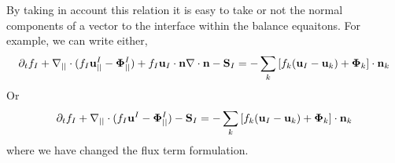 By taking in account this relation it is easy to take or not the normal components of a vector to the interface within the balance equaitons. 
For example, we can write either, 
\begin{equation}
    \partial_t f_I  
    + \mathbf{\nabla}_{||}\cdot (f_I \textbf{u}^I_{||} -\mathbf{\Phi}^I_{||})
    + f_I \textbf{u}_I \cdot \textbf{n} \mathbf{\nabla}\cdot \textbf{n}
    - \textbf{S}_I
    = 
    - \sum_k \left[
    f_k (\textbf{u}_I - \textbf{u}_k)
    + \mathbf{\Phi}_k
    \right] \cdot \textbf{n}_k 
    \label{ap:eq:dt_f_I2}
\end{equation}
Or 
\begin{equation}
    \partial_t f_I  
    + \mathbf{\nabla}_{||}\cdot (f_I \textbf{u}^I -\mathbf{\Phi}^I_{||})
    - \textbf{S}_I
    = 
    - \sum_k \left[
    f_k (\textbf{u}_I - \textbf{u}_k)
    + \mathbf{\Phi}_k
    \right] \cdot \textbf{n}_k 
    \label{ap:eq:dt_f_I2}
\end{equation}
where we have changed the flux term formulation. 





